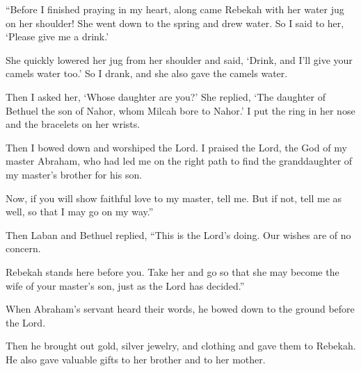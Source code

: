 \begin{scripture}
 ``Before I finished praying in my heart, along came Rebekah with her water jug on her shoulder! She went down to the spring and drew water. So I said to her, `Please give me a drink.'
 She quickly lowered her jug from her shoulder and said, `Drink, and I'll give your camels water too.' So I drank, and she also gave the camels water.
 Then I asked her, `Whose daughter are you?' She replied, `The daughter of Bethuel the son of Nahor, whom Milcah bore to Nahor.' I put the ring in her nose and the bracelets on her wrists.
 Then I bowed down and worshiped the Lord. I praised the Lord, the God of my master Abraham, who had led me on the right path to find the granddaughter of my master's brother for his son.
 Now, if you will show faithful love to my master, tell me. But if not, tell me as well, so that I may go on my way.''
\everypar{}

 Then Laban and Bethuel replied, ``This is the Lord's doing. Our wishes are of no concern.
 Rebekah stands here before you. Take her and go so that she may become the wife of your master's son, just as the Lord has decided.''
\everypar{}

 When Abraham's servant heard their words, he bowed down to the ground before the Lord.
 Then he brought out gold, silver jewelry, and clothing and gave them to Rebekah. He also gave valuable gifts to her brother and to her mother.
\everypar{}


\end{scripture}
